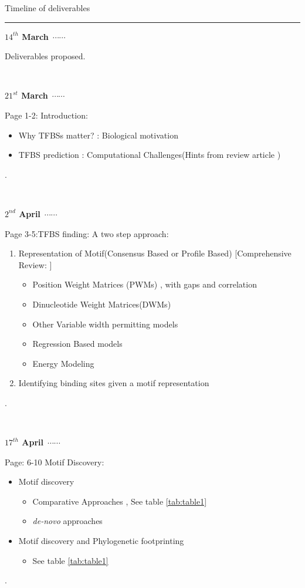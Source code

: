 \documentclass[a4paper,11pt]{article}
\newcommand\ytl[2]{
\parbox[b]{8em}{\hfill{\color{cyan}\bfseries\sffamily #1}~$\cdots\cdots$~}\makebox[0pt][c]{$\bullet$}\vrule\quad \parbox[c]{4.5cm}{\vspace{7pt}\color{red!40!black!80}\raggedright\sffamily #2.\\[7pt]}\\[-3pt]}
\begin{document}
\begin{table}
\caption{Timeline of deliverables}
\label{tab:table2}
\centering
\footnotesize
\begin{minipage}[t]{.7\linewidth}
\color{gray}
\rule{\linewidth}{1pt}
\bigskip
\ytl{$14^{th}$ March}{Deliverables proposed}
\bigskip
\ytl{$21^{st}$ March}{Page 1-2: Introduction:\footnotesize\begin{itemize}\itemsep0em 
\item Why TFBSs matter? : Biological motivation
\item TFBS prediction : Computational Challenges(Hints from review article \cite{weirauch_evaluation_2013})
\end{itemize}}
\bigskip
\ytl{$2^{nd}$ April}{Page 3-5:TFBS finding: A two step approach: \footnotesize\begin{enumerate}\itemsep0em 
\item Representation of Motif(Consensus Based or Profile Based) [Comprehensive Review: \cite{stormo_modeling_2013}]\begin{itemize}
\item Position Weight Matrices (PWMs) \cite{stormo_dna_2000}, with gaps and correlation \cite{hertz_identification_1990,hertz_identifying_1999}
\item Dinucleotide Weight Matrices(DWMs) \cite{siddharthan_dinucleotide_2010}
\item Other Variable width permitting models \cite{sandelin_prediction_2005,lyakhov_discovery_2008,riley_p53hmm_2009}
\item Regression Based models \cite{wang_interaction-dependent_2007,annala_linear_2011}
\item Energy Modeling \cite{zhao_inferring_2009}
\end{itemize}
\item Identifying binding sites given a motif representation
\end{enumerate}}
\bigskip
\ytl{$17^{th}$ April}{Page: 6-10 Motif Discovery:
\begin{itemize}
\item Motif discovery \begin{itemize}
\item Comparative Approaches , See table \ref{tab:table1}
\item \textit{de-novo} approaches
\end{itemize}
\item Motif discovery and Phylogenetic footprinting \begin{itemize}
\item See table \ref{tab:table1}
\end{itemize}
\end{itemize}
}
\end{minipage}
\end{table}
\end{document}
